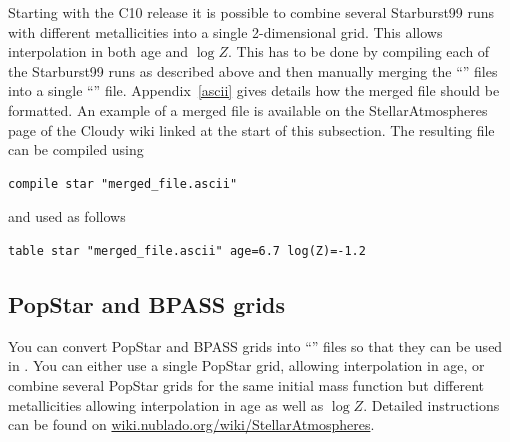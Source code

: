 Starting with the C10 release it is possible to combine several
Starburst99 runs with different metallicities into a single 2-dimensional
grid. This allows interpolation in both age and $\log Z$. This has
to be done by compiling each of the Starburst99 runs as described above
and then manually merging the ``'' files into a single
``'' file. Appendix~\ref{ascii} gives details how the merged
file should be formatted. An example of a merged file is available on the
StellarAtmospheres page of the Cloudy wiki linked at the start of this subsection.
The resulting file can be compiled using
\begin{verbatim}
compile star "merged_file.ascii"
\end{verbatim}
and used as follows
\begin{verbatim}
table star "merged_file.ascii" age=6.7 log(Z)=-1.2
\end{verbatim}

\subsection{PopStar and BPASS grids}

You can convert PopStar and BPASS grids into ``'' files so
that they can be used in \Cloudy. You can either use a single PopStar grid,
allowing interpolation in age, or combine several PopStar grids for the same
initial mass function but different metallicities allowing interpolation in
age as well as $\log Z$. Detailed instructions can be found on
\href{http://gitlab.nublado.org/cloudy/cloudy/-/wikis/StellarAtmospheres}{wiki.nublado.org/wiki/StellarAtmospheres}.
